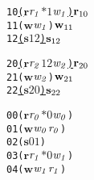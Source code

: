 \newsavebox{\boxtwono}
\begin{lrbox}{\boxtwono}
\begin{minipage}[t]{0.65\linewidth}
\large
\begin{alltt}
10 \underline{(\(\mathbf{r}\) \(\mathit{r\sb{1}}\) \(\mathit{\ast 1}\) \(\mathit{w\sb{1}}\)) \(\mathbf{r}\sb{10}\)}
11 (\(\mathbf{w}\) \(\mathit{w\sb{1}}\)) \(\mathbf{w}\sb{11}\)
12 \underline{(\(\mathbf{s}\) \(\mathit{1 2}\)) \(\mathbf{s}\sb{12}\)}
\end{alltt}
\end{minipage}
\end{lrbox}

\newsavebox{\boxthreeno}
\begin{lrbox}{\boxthreeno}
\begin{minipage}[t]{0.65\linewidth}
\large
\begin{alltt}
20 \underline{(\(\mathbf{r}\) \(\mathit{r\sb{2}}\) \(\mathit{1 2}\) \(\mathit{w\sb{2}}\)) \(\mathbf{r}\sb{20}\)}
21 (\(\mathbf{w}\) \(\mathit{w\sb{2}}\)) \(\mathbf{w}\sb{21}\)
22 \underline{(\(\mathbf{s}\) \(\mathit{2 0}\)) \(\mathbf{s}\sb{22}\)}
\end{alltt}
\end{minipage}
\end{lrbox}


\newcommand\examplefigfour{
\begin{figure*}[tb]
\begin{center}
\setlength{\tabcolsep}{2pt}
\begin{tabular}[t]{c|c|c}
$p_0$ & $p_1$ & $p_2$ \\
\hline
\scalebox{0.8}{\usebox{\boxoneno}}&
\scalebox{0.8}{\usebox{\boxtwono}} &
\scalebox{0.8}{\usebox{\boxthreeno}}\\
\end{tabular}
\end{center}
\caption{No Deadlock Caused by Circular Dependency in Messages}
\label{fig:nodeadlock2}
\end{figure*}
}

\newsavebox{\boxonezerobuffer}
\begin{lrbox}{\boxonezerobuffer}
\begin{minipage}[t]{0.65\linewidth}
\large
\begin{alltt}
00 (\(\mathbf{r}\) \(\mathit{r\sb{0}}\) \(\mathit{\ast 0}\) \(\mathit{w\sb{0}}\)) 
01 (\(\mathbf{w}\) \(\mathit{w\sb{0}}\) \(\mathit{r\sb{0}}\))
02 (\(\mathbf{s}\) \(\mathit{0 1}\)) 
03 (\(\mathbf{r}\) \(\mathit{r\sb{1}}\) \(\mathit{\ast 0}\) \(\mathit{w\sb{1}}\)) 
04 (\(\mathbf{w}\) \(\mathit{w\sb{1}}\) \(\mathit{r\sb{1}}\))
\end{alltt}
\end{minipage}
\end{lrbox}

